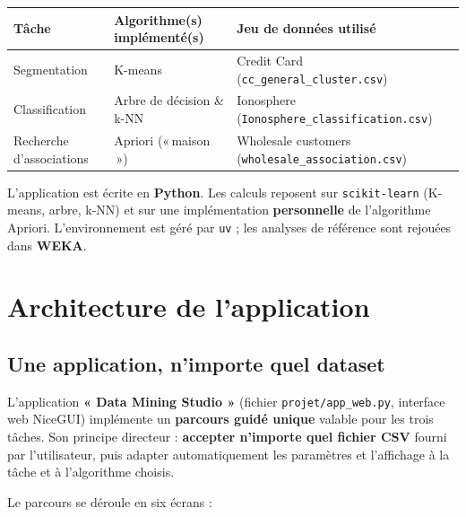 \documentclass[11pt,a4paper]{article}
\providecommand{\og}{«\,}
\providecommand{\fg}{\,»}
\begin{document}
\begin{center}
\begin{tabular}{@{}p{3.6cm}p{4.6cm}p{5.4cm}@{}}
\toprule
\textbf{Tâche} & \textbf{Algorithme(s) implémenté(s)} & \textbf{Jeu de données utilisé} \\
\midrule
Segmentation & K-means & Credit Card (\texttt{cc\_general\_cluster.csv}) \\
Classification & Arbre de décision \& k-NN & Ionosphere (\texttt{Ionosphere\_classification.csv}) \\
Recherche d'associations & Apriori (\og maison \fg) & Wholesale customers (\texttt{wholesale\_association.csv}) \\
\bottomrule
\end{tabular}
\end{center}

\begin{exemple}
L'application est écrite en \textbf{Python}. Les calculs reposent sur
\texttt{scikit-learn} (K-means, arbre, k-NN) et sur une implémentation
\textbf{personnelle} de l'algorithme Apriori. L'environnement est géré par
\texttt{uv} ; les analyses de référence sont rejouées dans \textbf{WEKA}.
\end{exemple}

\section{Architecture de l'application}

\subsection{Une application, n'importe quel dataset}

\begin{appbox}
L'application \textbf{« Data Mining Studio »} (fichier \texttt{projet/app\_web.py},
interface web NiceGUI) implémente un \textbf{parcours guidé unique} valable pour
les trois tâches. Son principe directeur : \textbf{accepter n'importe quel fichier
CSV} fourni par l'utilisateur, puis adapter automatiquement les paramètres et
l'affichage à la tâche et à l'algorithme choisis.
\end{appbox}

\noindent Le parcours se déroule en six écrans :
\end{document}
